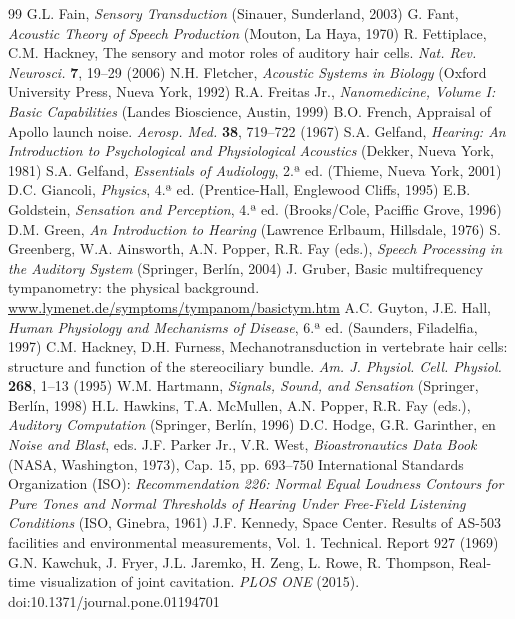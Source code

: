 \documentclass[12pt]{book}
\begin{document}
\begin{thebibliography}{99}
 G.L. Fain, \textit{Sensory Transduction} (Sinauer, Sunderland, 2003)
 G. Fant, \textit{Acoustic Theory of Speech Production} (Mouton, La Haya, 1970)
 R. Fettiplace, C.M. Hackney, The sensory and motor roles of auditory hair cells. \textit{Nat. Rev. Neurosci.} \textbf{7}, 19--29 (2006)
 N.H. Fletcher, \textit{Acoustic Systems in Biology} (Oxford University Press, Nueva York, 1992)
 R.A. Freitas Jr., \textit{Nanomedicine, Volume I: Basic Capabilities} (Landes Bioscience, Austin, 1999)
 B.O. French, Appraisal of Apollo launch noise. \textit{Aerosp. Med.} \textbf{38}, 719--722 (1967)
 S.A. Gelfand, \textit{Hearing: An Introduction to Psychological and Physiological Acoustics} (Dekker, Nueva York, 1981)
 S.A. Gelfand, \textit{Essentials of Audiology}, 2.ª ed. (Thieme, Nueva York, 2001)
 D.C. Giancoli, \textit{Physics}, 4.ª ed. (Prentice-Hall, Englewood Cliffs, 1995)
 E.B. Goldstein, \textit{Sensation and Perception}, 4.ª ed. (Brooks/Cole, Paciffic Grove, 1996)
 D.M. Green, \textit{An Introduction to Hearing} (Lawrence Erlbaum, Hillsdale, 1976)
 S. Greenberg, W.A. Ainsworth, A.N. Popper, R.R. Fay (eds.), \textit{Speech Processing in the Auditory System} (Springer, Berlín, 2004)
 J. Gruber, Basic multifrequency tympanometry: the physical background. \url{www.lymenet.de/symptoms/tympanom/basictym.htm}
 A.C. Guyton, J.E. Hall, \textit{Human Physiology and Mechanisms of Disease}, 6.ª ed. (Saunders, Filadelfia, 1997)
 C.M. Hackney, D.H. Furness, Mechanotransduction in vertebrate hair cells: structure and function of the stereociliary bundle. \textit{Am. J. Physiol. Cell. Physiol.} \textbf{268}, 1--13 (1995)
 W.M. Hartmann, \textit{Signals, Sound, and Sensation} (Springer, Berlín, 1998)
 H.L. Hawkins, T.A. McMullen, A.N. Popper, R.R. Fay (eds.), \textit{Auditory Computation} (Springer, Berlín, 1996)
 D.C. Hodge, G.R. Garinther, en \textit{Noise and Blast}, eds. J.F. Parker Jr., V.R. West, \textit{Bioastronautics Data Book} (NASA, Washington, 1973), Cap. 15, pp. 693--750
 International Standards Organization (ISO): \textit{Recommendation 226: Normal Equal Loudness Contours for Pure Tones and Normal Thresholds of Hearing Under Free-Field Listening Conditions} (ISO, Ginebra, 1961)
 J.F. Kennedy, Space Center. Results of AS-503 facilities and environmental measurements, Vol. 1. Technical. Report 927 (1969)
 G.N. Kawchuk, J. Fryer, J.L. Jaremko, H. Zeng, L. Rowe, R. Thompson, Real-time visualization of joint cavitation. \textit{PLOS ONE} (2015). doi:10.1371/journal.pone.01194701

\end{thebibliography}
\end{document}
